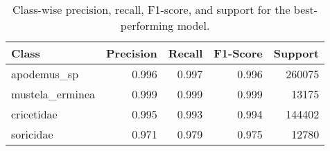 \begin{table}[H]
\centering
\caption{Class-wise precision, recall, F1-score, and support for the best-performing model.}
\label{tab:precision_recall_fscore_support}
\begin{tabular}{l r r r r}
\toprule
Class & Precision & Recall & F1-Score & Support \\
\midrule
apodemus\_sp & 0.996 & 0.997 & 0.996 & 260075 \\
mustela\_erminea & 0.999 & 0.999 & 0.999 & 13175 \\
cricetidae & 0.995 & 0.993 & 0.994 & 144402 \\
soricidae & 0.971 & 0.979 & 0.975 & 12780 \\
\bottomrule
\end{tabular}
\end{table}